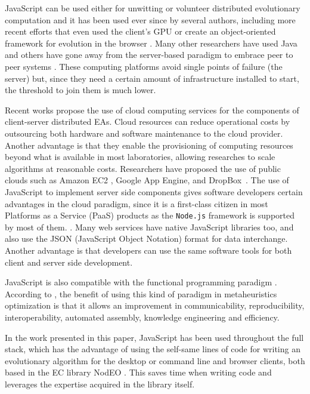 \documentclass[journal,onecolumn]{IEEEtran}
\begin{document}
JavaScript can be used either for unwitting
\cite{unwitting-ec} or volunteer 
\cite{langdon:2005:metas,gecco07:workshop:dcor} distributed
evolutionary computation and it has been used ever since by several
authors, including more recent efforts
\cite{Desell:2008:AHG:1389095.1389273,duda2013distributed,DBLP:journals/corr/abs-0801-1210} 
that even
used the client's GPU \cite{duda2013gpu} or create an object-oriented
framework for evolution in the browser \cite{EvoStar2014:jsEO}. Many other researchers have
used Java \cite{chong:1999:jDGPi} and others have gone away from the
server-based paradigm to embrace peer to peer systems
\cite{jin2006constructing,10.1109/ICICSE.2008.99,DBLP:conf/3pgcic/GuervosMFEL12}. These computing
platforms avoid single points of failure (the server) but, since they
need a certain amount of infrastructure installed to start, the
threshold to join them is much lower.

Recent works propose the use of cloud computing services for the components of
client-server distributed EAs. Cloud resources
can reduce operational costs by outsourcing both hardware and software maintenance
to the cloud provider. Another advantage is that they enable the provisioning of computing resources beyond what
is available in most laboratories, allowing researches to
scale algorithms at reasonable costs. Researchers have proposed the use of
public clouds such as Amazon EC2 \cite{CloudScale}, Google App Engine\cite{di2013towards},
and DropBox~\cite{mericloud}. The use of JavaScript to implement
server side components
gives software developers certain advantages in the cloud
paradigm, since it is a first-class citizen
in most Platforms as a Service (PaaS) products as the {\tt Node.js} framework is supported by most of them. \cite{wood13:nodejs:paas}. Many web services
have native JavaScript libraries too, and also use the JSON (JavaScript Object Notation) format for data interchange. Another advantage is that
developers can use the same software tools for both client and server
side development.

JavaScript is also compatible with the functional programming paradigm \cite{Cousineau1998,MacLennan1990,Thompson1996}.
According to \cite{swanresearch2015}, the benefit of using this kind of paradigm in
metaheuristics optimization is that it allows an improvement in communicability,
reproducibility, interoperability, automated assembly, knowledge engineering
and efficiency.

In the work presented in this paper, JavaScript has been used throughout the full
stack, which has the advantage of using the self-same lines of code for
writing an evolutionary algorithm for the
desktop or command line and browser clients, both based in the EC
library {\sf NodEO} \cite{DBLP:conf/gecco/GuervosVGES14}. This saves time 
when writing code and leverages 
the expertise acquired
 in the library itself. 
\end{document}

